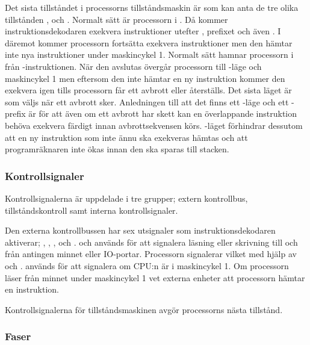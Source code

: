 \documentclass[main.tex]{subfiles}
\begin{document}
Det sista tillståndet i processorns tillståndsmaskin är  som kan
anta de tre olika tillstånden ,  och .
Normalt sätt är processorn i . Då kommer instruktionsdekodaren
exekvera instruktioner utefter , prefixet och även . I
 däremot kommer processorn fortsätta exekvera instruktioner men den
hämtar inte nya instruktioner under maskincykel 1. Normalt sätt hamnar
processorn i  från -instruktionen. När den avslutas
övergår processorn till -läge och maskincykel 1 men eftersom den
inte hämtar en ny instruktion kommer den exekvera  igen tills
processorn får ett avbrott eller återställs. Det sista läget är
 som väljs när ett avbrott sker. Anledningen till att det finns
ett -läge och ett -prefix är för att även om ett
avbrott har skett kan en överlappande instruktion behöva exekvera färdigt innan
avbrottsekvensen körs. -läget förhindrar dessutom att en ny
instruktion som inte ännu ska exekveras hämtas och att programräknaren inte
ökas innan den ska sparas till stacken.

\subsubsection{Kontrollsignaler}
Kontrollsignalerna är uppdelade i tre grupper; extern kontrollbus,
tillståndskontroll samt interna kontrollsignaler.

Den externa kontrollbussen har sex utsignaler som instruktionsdekodaren
aktiverar; , , ,  och .
 och  används för att signalera läsning eller skrivning till
och från antingen minnet eller IO-portar. Processorn signalerar vilket med
hjälp av  och .  används för att signalera om
CPU:n är i maskincykel 1. Om processorn läser från minnet under maskincykel 1
vet externa enheter att processorn hämtar en instruktion.

Kontrollsignalerna för tillståndsmaskinen avgör processorns nästa tillstånd.

\subsubsection{Faser}
\end{document}
